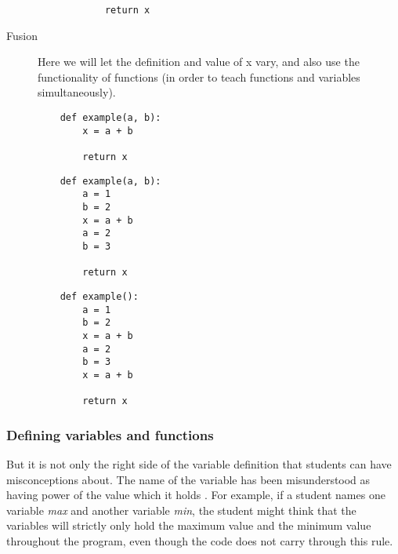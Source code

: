 \begin{description}
\begin{minipage}[t]{0.45\columnwidth}
\begin{verbatim}
            return x
  \end{verbatim}
\end{minipage}
\newline

    \item [Fusion] Here we will let the definition and value of x vary, and 
also use the functionality of functions (in order to teach functions 
and variables simultaneously). 

\hfill
\begin{minipage}[t]{0.3\columnwidth}
  \begin{verbatim}
    def example(a, b):
        x = a + b

        return x
  \end{verbatim}
\end{minipage}
\hfill
\begin{minipage}[t]{0.3\columnwidth}
  \begin{verbatim}
    def example(a, b):
        a = 1
        b = 2
        x = a + b
        a = 2
        b = 3

        return x
  \end{verbatim}
\end{minipage}
\hfill
\begin{minipage}[t]{0.3\columnwidth}
  \begin{verbatim}
    def example():
        a = 1
        b = 2
        x = a + b
        a = 2
        b = 3
        x = a + b

        return x
  \end{verbatim}
\end{minipage}
    
\end{description}



\subsubsection{Defining variables and functions}

But it is not only the right side of the variable definition that students 
can 
have misconceptions about. The name of the variable has been misunderstood 
as 
having power of the value which it holds 
\parencite{MisconceptionsSurvey2017,Sleeman1984}. For example, if a student 
names one variable \emph{max} and another variable \emph{min}, the student 
might think that the variables will strictly only hold the maximum value and 
the minimum value throughout the program, even though the code does not 
carry through this rule. 

